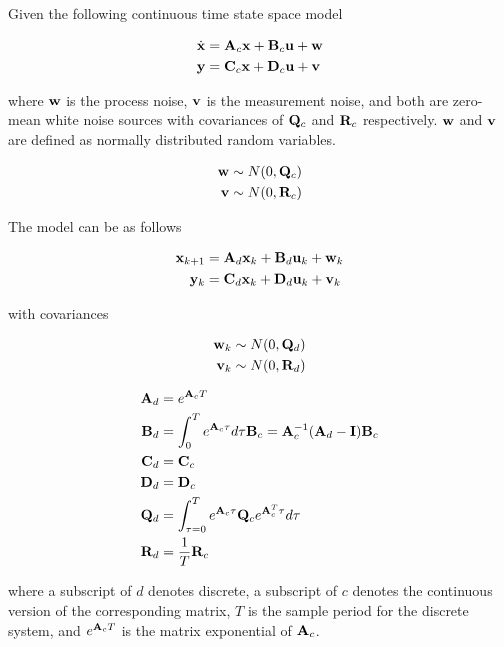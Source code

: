 Given the following continuous time state space model

\begin{align*}
  \dot{\mathbf{x}} &= \mathbf{A}_c\mathbf{x} + \mathbf{B}_c\mathbf{u} + \mathbf{w} \\
  \mathbf{y} &= \mathbf{C}_c\mathbf{x} + \mathbf{D}_c\mathbf{u} + \mathbf{v}
\end{align*}

where $\mathbf{w}$ is the process noise, $\mathbf{v}$ is the measurement noise, and
both are zero-mean white noise sources with covariances of $\mathbf{Q}_c$ and
$\mathbf{R}_c$ respectively. $\mathbf{w}$ and $\mathbf{v}$ are defined as normally
distributed random variables.

\begin{align*}
  \mathbf{w} &\sim N(0, \mathbf{Q}_c) \\
  \mathbf{v} &\sim N(0, \mathbf{R}_c)
\end{align*}

The model can be  as follows

\begin{align*}
  \mathbf{x}_{k+1} &= \mathbf{A}_d \mathbf{x}_k + \mathbf{B}_d \mathbf{u}_k + \mathbf{w}_k \\
   \mathbf{y}_k &= \mathbf{C}_d \mathbf{x}_k + \mathbf{D}_d \mathbf{u}_k + \mathbf{v}_k
\end{align*}

with covariances

\begin{align*}
  \mathbf{w}_k &\sim N(0, \mathbf{Q}_d) \\
  \mathbf{v}_k &\sim N(0, \mathbf{R}_d)
\end{align*}

\begin{theorem}
  \label{thm:zoh-ss}

  \begin{align}
    \mathbf{A}_d &= e^{\mathbf{A}_c T} \\
    \mathbf{B}_d &= \int_0^T e^{\mathbf{A}_c \tau} d\tau \mathbf{B}_c =
      \mathbf{A}_c^{-1} (\mathbf{A}_d - \mathbf{I}) \mathbf{B}_c \\
    \mathbf{C}_d &= \mathbf{C}_c \\
    \mathbf{D}_d &= \mathbf{D}_c \\
    \mathbf{Q}_d &= \int_{\tau = 0}^{T} e^{\mathbf{A}_c\tau} \mathbf{Q}_c
      e^{\mathbf{A}_c^T\tau} d\tau \\
    \mathbf{R}_d &= \frac{1}{T} \mathbf{R}_c
  \end{align}

  where a subscript of $d$ denotes discrete, a subscript of $c$ denotes the
  continuous version of the corresponding matrix, $T$ is the sample period for
  the discrete \gls{system}, and $e^{\mathbf{A}_c T}$ is the matrix exponential of
  $\mathbf{A}_c$.
\end{theorem}

